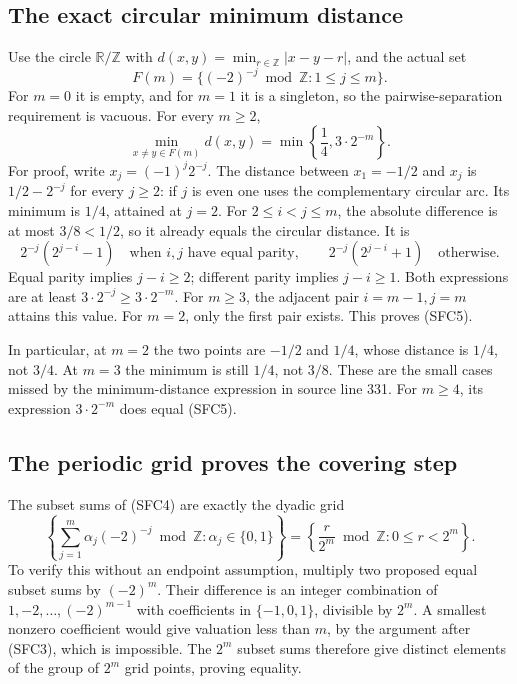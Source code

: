 \subsection{The exact circular minimum distance}

Use the circle $\mathbb R/\mathbb Z$ with
$d(x,y)=\min_{r\in\mathbb Z}|x-y-r|$, and the actual set
\begin{equation}\tag{SFC4}
 F(m)=\{(-2)^{-j}\bmod\mathbb Z:1\le j\le m\}.
\end{equation}
For $m=0$ it is empty, and for $m=1$ it is a singleton, so the
pairwise-separation requirement is vacuous. For every $m\ge2$,
\begin{equation}\tag{SFC5}
 \min_{x\ne y\in F(m)}d(x,y)
      =\min\left\{\frac14,3\cdot2^{-m}\right\}.
\end{equation}
For proof, write $x_j=(-1)^j2^{-j}$. The distance between $x_1=-1/2$
and $x_j$ is $1/2-2^{-j}$ for every $j\ge2$: if $j$ is even one
uses the complementary circular arc. Its minimum is $1/4$, attained
at $j=2$. For $2\le i<j\le m$, the absolute difference is at most
$3/8<1/2$, so it already equals the circular distance. It is
\[
 2^{-j}(2^{j-i}-1)\quad\text{when }i,j\text{ have equal parity},
 \qquad
 2^{-j}(2^{j-i}+1)\quad\text{otherwise}.
\]
Equal parity implies $j-i\ge2$; different parity implies $j-i\ge1$.
Both expressions are at least $3\cdot2^{-j}\ge3\cdot2^{-m}$.
For $m\ge3$, the adjacent pair $i=m-1,j=m$ attains this value.
For $m=2$, only the first pair exists. This proves (SFC5).

In particular, at $m=2$ the two points are $-1/2$ and $1/4$, whose
distance is $1/4$, not $3/4$. At $m=3$ the minimum is still $1/4$,
not $3/8$. These are the small cases missed by the minimum-distance
expression in source line 331. For $m\ge4$, its expression
$3\cdot2^{-m}$ does equal (SFC5).

\subsection{The periodic grid proves the covering step}

The subset sums of (SFC4) are exactly the dyadic grid
\begin{equation}\tag{SFC6}
 \left\{\sum_{j=1}^m\alpha_j(-2)^{-j}\bmod\mathbb Z:
               \alpha_j\in\{0,1\}\right\}
       =\left\{\frac{r}{2^m}\bmod\mathbb Z:0\le r<2^m\right\}.
\end{equation}
To verify this without an endpoint assumption, multiply two proposed
equal subset sums by $(-2)^m$. Their difference is an integer
combination of $1,-2,\ldots,(-2)^{m-1}$ with coefficients in
$\{-1,0,1\}$, divisible by $2^m$. A smallest nonzero coefficient
would give valuation less than $m$, by the argument after (SFC3),
which is impossible. The $2^m$ subset sums therefore give distinct
elements of the group of $2^m$ grid points, proving equality.

